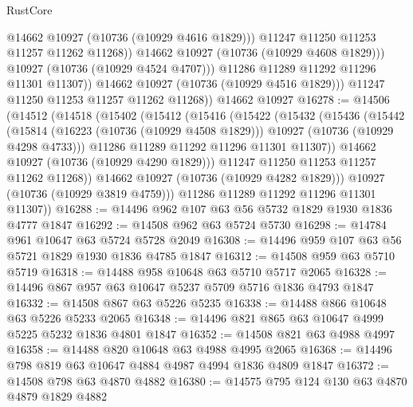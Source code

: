 \begin{lexlean}{RustCore}
\begin{coremodule}
                        @14662
                        @10927
                        (@10736 (@10929 @4616 @1829)))
                      @11247
                      @11250
                      @11253
                      @11257
                      @11262
                      @11268))
                  @14662
                  @10927
                  (@10736 (@10929 @4608 @1829)))
                @10927
                (@10736 (@10929 @4524 @4707)))
              @11286
              @11289
              @11292
              @11296
              @11301
              @11307))
          @14662
          @10927
          (@10736 (@10929 @4516 @1829)))
        @11247
        @11250
        @11253
        @11257
        @11262
        @11268))
    @14662
    @10927
@16278 := @14506
    (@14512
      (@14518
        (@15402
          (@15412
            (@15416
              (@15422
                (@15432
                  (@15436
                    (@15442
                      (@15814
                        (@16223 (@10736 (@10929 @4508 @1829)))
                        @10927
                        (@10736 (@10929 @4298 @4733)))
                      @11286
                      @11289
                      @11292
                      @11296
                      @11301
                      @11307))
                  @14662
                  @10927
                  (@10736 (@10929 @4290 @1829)))
                @11247
                @11250
                @11253
                @11257
                @11262
                @11268))
            @14662
            @10927
            (@10736 (@10929 @4282 @1829)))
          @10927
          (@10736 (@10929 @3819 @4759)))
        @11286
        @11289
        @11292
        @11296
        @11301
        @11307))
@16288 := @14496 @962 @107 @63 @56 @5732 @1829 @1930 @1836 @4777 @1847
@16292 := @14508 @962 @63 @5724 @5730
@16298 := @14784 @961 @10647 @63 @5724 @5728 @2049
@16308 := @14496 @959 @107 @63 @56 @5721 @1829 @1930 @1836 @4785 @1847
@16312 := @14508 @959 @63 @5710 @5719
@16318 := @14488 @958 @10648 @63 @5710 @5717 @2065
@16328 := @14496 @867 @957 @63 @10647 @5237 @5709 @5716 @1836 @4793 @1847
@16332 := @14508 @867 @63 @5226 @5235
@16338 := @14488 @866 @10648 @63 @5226 @5233 @2065
@16348 := @14496 @821 @865 @63 @10647 @4999 @5225 @5232 @1836 @4801 @1847
@16352 := @14508 @821 @63 @4988 @4997
@16358 := @14488 @820 @10648 @63 @4988 @4995 @2065
@16368 := @14496 @798 @819 @63 @10647 @4884 @4987 @4994 @1836 @4809 @1847
@16372 := @14508 @798 @63 @4870 @4882
@16380 := @14575 @795 @124 @130 @63 @4870 @4879 @1829 @4882

\end{coremodule}
\end{lexlean}
